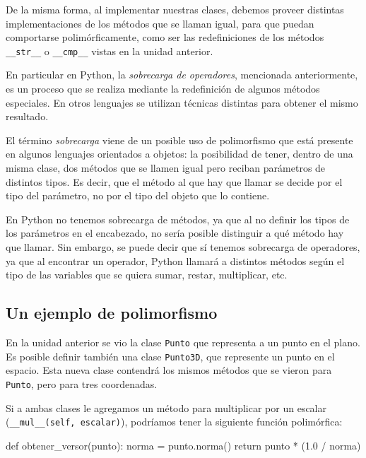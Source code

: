 De la misma forma, al implementar nuestras clases, debemos proveer
distintas implementaciones de los métodos que se llaman igual, para que
puedan comportarse polimórficamente, como ser las redefiniciones de los
métodos \lstinline!__str__! o \lstinline!__cmp__! vistas en la unidad
anterior.

En particular en Python, la {\it sobrecarga de operadores}, mencionada
anteriormente,  es un proceso que se realiza mediante la redefinición de
algunos métodos especiales.  En otros lenguajes se utilizan técnicas distintas
para obtener el mismo resultado.

\begin{sabias_que}
El término {\it sobrecarga} viene de un posible uso de polimorfismo que
está presente en algunos lenguajes orientados a objetos: la posibilidad de
tener, dentro de una misma clase, dos métodos que se llamen igual pero
reciban parámetros de distintos tipos.  Es decir, que el método al que hay
que llamar se decide por el tipo del parámetro, no por el tipo del objeto
que lo contiene.

En Python no tenemos sobrecarga de métodos, ya que al no definir los tipos
de los parámetros en el encabezado, no sería posible distinguir a qué
método hay que llamar.  Sin embargo, se puede decir que sí tenemos
sobrecarga de operadores, ya que al encontrar un operador, Python llamará a
distintos métodos según el tipo de las variables que se quiera sumar,
restar, multiplicar, etc.
\end{sabias_que}

\subsection{Un ejemplo de polimorfismo}

En la unidad anterior se vio la clase \lstinline!Punto! que representa a un
punto en el plano.  Es posible definir también una clase
\lstinline!Punto3D!, que represente un punto en el espacio.  Esta nueva
clase contendrá los mismos métodos que se vieron para \lstinline!Punto!,
pero para tres coordenadas.

Si a ambas clases le agregamos un método para multiplicar por un escalar
(\lstinline!__mul__(self, escalar)!), podríamos tener la siguiente función
polimórfica:

\begin{codigo-python-sn}
def obtener_versor(punto):
    norma = punto.norma()
    return punto * (1.0 / norma)
\end{codigo-python-sn}

